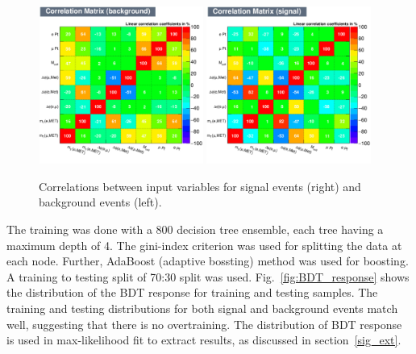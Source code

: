 \begin{figure}[htpb]
\begin{center}
\includegraphics[width=0.48\textwidth]{plots_and_figures/chapter5/CorrelationMatrixB.pdf}
\includegraphics[width=0.48\textwidth]{plots_and_figures/chapter5/CorrelationMatrixS.pdf}\\
\end{center}
\caption{ Correlations between input variables for signal events (right) and background events (left).}
\label{fig:bdt_corr_mat}
\end{figure}

The training was done with a 800 decision tree ensemble, each tree having a maximum depth of 4. The gini-index criterion was used for splitting the data at each node. Further, AdaBoost (adaptive bossting) method was used for boosting. A training to testing split of 70:30 split was used. Fig.~\ref{fig:BDT_response} shows the distribution of the BDT response for training and testing samples. The training and testing distributions for both signal and background events match well, suggesting that there is no overtraining. The distribution of BDT response is used in max-likelihood fit to extract results, as discussed in section~\ref{sig_ext}.  

